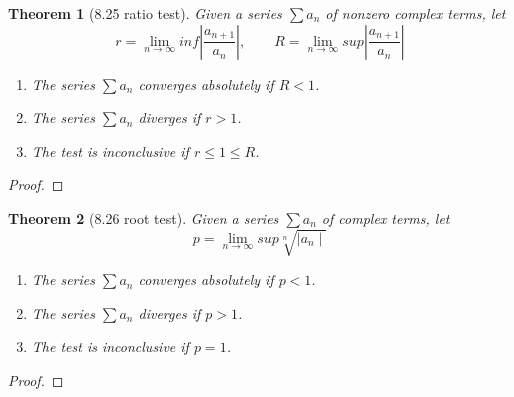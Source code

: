 \documentclass[aps,pra,notitlepage,amsmath,amssymb,letterpaper,12pt]{revtex4-1}
\newtheorem{theorem}{Theorem}
\begin{document}
\begin{theorem}[8.25 ratio test]
Given a series $\sum a_{n}$ of nonzero complex terms, let
\[r = \lim_{n \to \infty} inf \left| \frac{a_{n+1}}{a_{n}}\right|, \qquad R = \lim_{n \to \infty} sup \left| \frac{a_{n+1}}{a_{n}}\right|\]
\begin{enumerate}[\upshape a)]
  \item The series $\sum a_{n}$ converges absolutely if $R < 1$.
  \item The series $\sum a_{n}$ diverges if $r>1$.
  \item The test is inconclusive if $r \leq 1 \leq R$.
\end{enumerate}
\end{theorem}
\begin{proof}
\end{proof}

\begin{theorem}[8.26 root test]
Given a series $\sum a_{n}$ of complex terms, let
\[p = \lim_{n \to \infty} sup \sqrt[n]{\mid a_{n} \mid}\]
\begin{enumerate}[\upshape a)]
  \item The series $\sum a_{n}$ converges absolutely if $p < 1$.
  \item The series $\sum a_{n}$ diverges if $p>1$.
  \item The test is inconclusive if $p=1$.
\end{enumerate}
\end{theorem}
\begin{proof}
\end{proof}


\end{document}
